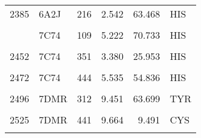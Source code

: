 \begin{table}
\begin{tabular}{llrrrl}
			2385 & 6A2J & 216 & 2.542 & 63.468 & HIS\\
			\cellcolor{gray!6}{2412} & \cellcolor{gray!6}{6A2J} & \cellcolor{gray!6}{278} & \cellcolor{gray!6}{2.230} & \cellcolor{gray!6}{63.931} & \cellcolor{gray!6}{HIS}\\
			\addlinespace
			2426 & 7C74 & 109 & 5.222 & 70.733 & HIS\\
			\cellcolor{gray!6}{2442} & \cellcolor{gray!6}{7C74} & \cellcolor{gray!6}{312} & \cellcolor{gray!6}{8.496} & \cellcolor{gray!6}{58.176} & \cellcolor{gray!6}{TYR}\\
			2452 & 7C74 & 351 & 3.380 & 25.953 & HIS\\
			\cellcolor{gray!6}{2470} & \cellcolor{gray!6}{7C74} & \cellcolor{gray!6}{441} & \cellcolor{gray!6}{9.298} & \cellcolor{gray!6}{6.308} & \cellcolor{gray!6}{CYS}\\
			2472 & 7C74 & 444 & 5.535 & 54.836 & HIS\\
			\addlinespace
			\cellcolor{gray!6}{2481} & \cellcolor{gray!6}{7DMR} & \cellcolor{gray!6}{109} & \cellcolor{gray!6}{5.094} & \cellcolor{gray!6}{62.306} & \cellcolor{gray!6}{HIS}\\
			2496 & 7DMR & 312 & 9.451 & 63.699 & TYR\\
			\cellcolor{gray!6}{2507} & \cellcolor{gray!6}{7DMR} & \cellcolor{gray!6}{351} & \cellcolor{gray!6}{3.061} & \cellcolor{gray!6}{31.126} & \cellcolor{gray!6}{HIS}\\
			2525 & 7DMR & 441 & 9.664 & 9.491 & CYS\\
			\cellcolor{gray!6}{2527} & \cellcolor{gray!6}{7DMR} & \cellcolor{gray!6}{444} & \cellcolor{gray!6}{5.076} & \cellcolor{gray!6}{55.605} & \cellcolor{gray!6}{HIS}\\
			\bottomrule
		\end{tabular}
	\end{table}

